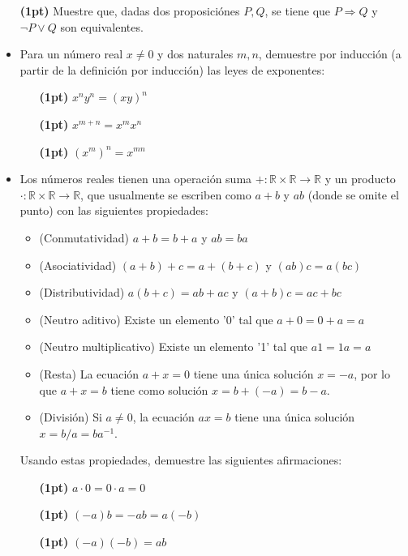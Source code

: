 \documentclass{article}
\newcommand{\R}{\mathbb{R}}
\begin{document}
\begin{itemize}
    \item[\bf (1pt)]  Muestre que, dadas dos proposiciónes $P, Q$, se tiene que $P\Rightarrow Q$ y $\neg P \vee Q$ son equivalentes. 
    \item Para un número real $x\neq 0$ y dos naturales $m,n$, demuestre por inducción (a partir de la definición por inducción) las leyes de exponentes: 
        \begin{itemize}
            \item[\bf (1pt)] $x^ny^n = (xy)^n$
            \item[\bf (1pt)] $x^{m+n} = x^mx^n$
            \item[\bf (1pt)] $(x^m)^n = x^{mn}$
        \end{itemize}
    \item Los números reales tienen una operación suma $+:\R\times \R\to \R$ y un producto $\cdot: \R\times\R\to \R$, que usualmente se escriben como $a+b$ y $ab$ (donde se omite el punto)  con las siguientes propiedades:
        \begin{itemize}
            \item (Conmutatividad) $a+b=b+a$ y $ab=ba$
            \item (Asociatividad) $(a+b)+c = a+(b+c)$ y $(ab)c = a(bc)$
            \item (Distributividad) $a(b+c) = ab+ac$ y $(a+b)c = ac+bc$
            \item (Neutro aditivo) Existe un elemento '0' tal que $a+0 = 0+a = a$
            \item (Neutro multiplicativo) Existe un elemento '1' tal que $a1 = 1a = a$
            \item (Resta) La ecuación $a+x =0$ tiene una única solución $x=-a$, por lo que $a+x = b$ tiene como solución $x = b + (-a) = b-a$.
            \item (División) Si $a\neq 0$, la ecuación $ax=b$ tiene una única solución $x = b/a = ba^{-1}$. 
        \end{itemize}

        Usando estas propiedades, demuestre las siguientes afirmaciones: 
        \begin{itemize}
            \item[\bf (1pt)]  $a \cdot 0 = 0 \cdot a = 0$
            \item[\bf (1pt)] $(-a)b = -ab = a(-b)$
            \item[\bf (1pt)] $(-a)(-b) = ab$
        \end{itemize}


\end{itemize}
\end{document}
